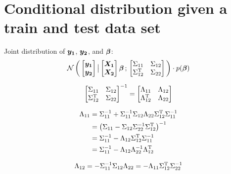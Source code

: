 \documentclass[twoside]{article}
\begin{document}
\section{Conditional distribution given a train and test data set}
Joint distribution of $\bm{y_1}$, $\bm{y_2}$, and $\bm{\beta}$:
\begin{align*}
\mathcal{N}\left(\, { {
\begin{bmatrix}
\bm{y_1}\\
\bm{y_2}
\end{bmatrix}
} \, \big| \, {
\begin{bmatrix}
\bm{X_1}\\
\bm{X_2}
\end{bmatrix}    
\bm{\beta}
} } \,;\, { {
\begin{bmatrix}
\Sigma_{11} & \Sigma_{12}\\
\Sigma_{12}^\mathrm{T} & \Sigma_{22} 
\end{bmatrix}
} } \,\right)
\cdot
p(\bm{\beta})
\end{align*}

\begin{align*}
\begin{bmatrix}
\Sigma_{11} & \Sigma_{12}\\
\Sigma_{12}^\mathrm{T} & \Sigma_{22} 
\end{bmatrix}^{-1}
= 
\begin{bmatrix}
\Lambda_{11} & \Lambda_{12}\\
\Lambda_{12}^\mathrm{T} & \Lambda_{22} 
\end{bmatrix}
\end{align*}

\begin{align*}
\Lambda_{11}
&=
\Sigma_{11}^{-1} +\Sigma_{11}^{-1}\Sigma_{12}\Lambda_{22}\Sigma_{12}^\mathrm{T}\Sigma_{11}^{-1}
\\&=
\left(\Sigma_{11} - \Sigma_{12}\Sigma_{22}^{-1}\Sigma_{12}^\mathrm{T}\right)^{-1}
\\&=
\Sigma_{11}^{-1} - \Lambda_{12}\Sigma_{12}^\mathrm{T}\Sigma_{11}^{-1}
\\&=
\Sigma_{11}^{-1} - \Lambda_{12}\Lambda_{22}^{-1}\Lambda_{12}^\mathrm{T}
\end{align*}

\begin{align*}
\Lambda_{12}
=
-\Sigma_{11}^{-1}\Sigma_{12}\Lambda_{22}
=
-\Lambda_{11}\Sigma_{12}^\mathrm{T}\Sigma_{22}^{-1}
\end{align*}
\end{document}
